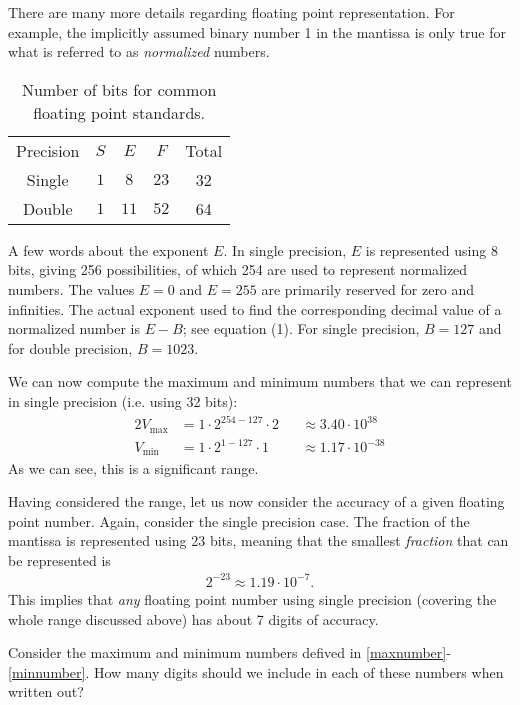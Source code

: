 There are many more details regarding floating point representation. For
example, the implicitly assumed binary number 1 in the mantissa is only true for
what is referred to as {\em normalized} numbers.

\begin{table}
  \centering
  \caption{Number of bits for common floating point standards.}
  \bgroup{}
  \begin{tabular}{ccccc} \hline
    Precision & $S$ & $E$ & $F$ & Total \\ \hhline{=====}
    Single & $1$ & $8$ & $23$ & 32
    \\ \hline
    Double & $1$ & $11$ & $52$ & 64
    \\ \hline
  \end{tabular}
  \egroup
\end{table}

A few words about the exponent $E$. In single precision, $E$ is represented
using 8 bits, giving 256 possibilities, of which 254 are used to represent
normalized numbers. The values $E=0$ and $E=255$ are primarily reserved for zero
and infinities. The actual exponent used to find the corresponding decimal value
of a normalized number is $E-B$; see equation (1). For single precision,
$B=127$ and for double precision, $B=1023$.

We can now compute the maximum and minimum numbers that we can represent in
single precision (i.e. using 32 bits):
\begin{alignat}{2}
  \label{maxnumber}
  V_{\text{max}} &= 1 \cdot 2^{254-127} \cdot 2 &&\approx 3.40 \cdot 10^{38} \\
  \label{minnumber}
  V_{\text{min}} &= 1\cdot 2^{1-127} \cdot 1 &&\approx 1.17 \cdot 10^{-38}
\end{alignat}
As we can see, this is a significant range.

Having considered the range, let us now consider the accuracy of a given
floating point number. Again, consider the single precision case. The fraction
of the mantissa is represented using 23 bits, meaning that the smallest {\em
fraction} that can be represented is
\begin{align*}
  2^{-23} \approx 1.19 \cdot 10^{-7}.
\end{align*}
This implies that {\em any} floating point number using single precision
(covering the whole range discussed above) has about 7 digits of accuracy.

\begin{ex}
  Consider the maximum and minimum numbers defived in
  \eqref{maxnumber}-\eqref{minnumber}. How many digits should we include in each
  of these numbers when written out?
\end{ex}

